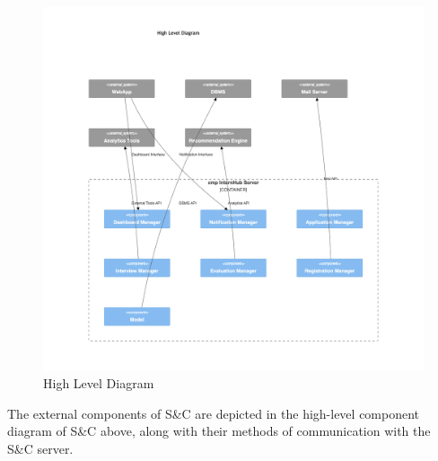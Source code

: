 \begin{figure}[H]
    \begin{center}
        \includegraphics[width=0.82\linewidth]{JhaBhatiaSharma/imagesDD/High Level Diagram.png}
        \caption{High Level Diagram}
        \label{fig:highleveldiagram}%
    \end{center}
\end{figure}

The external components of S\&C are depicted in the high-level component diagram of S\&C above, along with their methods of communication with the S\&C server.

